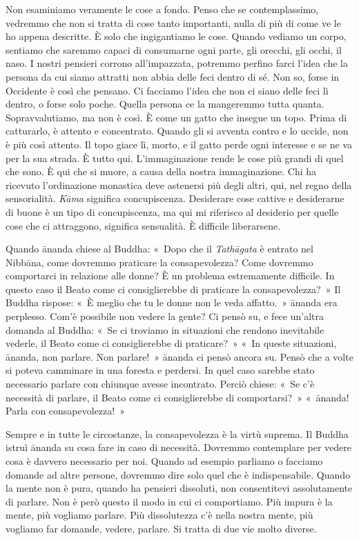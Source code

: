 Non esaminiamo veramente le cose a fondo. Penso che se contemplassimo,
vedremmo che non si tratta di cose tanto importanti, nulla di più di
come ve le ho appena descritte. È solo che ingigantiamo le cose. Quando
vediamo un corpo, sentiamo che saremmo capaci di consumarne ogni parte,
gli orecchi, gli occhi, il naso. I nostri pensieri corrono
all'impazzata, potremmo perfino farci l'idea che la persona da cui siamo
attratti non abbia delle feci dentro di sé. Non so, forse in Occidente è
così che pensano. Ci facciamo l'idea che non ci siano delle feci lì
dentro, o forse solo poche. Quella persona ce la mangeremmo tutta
quanta. Sopravvalutiamo, ma non è così. È come un gatto che insegue un
topo. Prima di catturarlo, è attento e concentrato. Quando gli si
avventa contro e lo uccide, non è più così attento. Il topo giace lì,
morto, e il gatto perde ogni interesse e se ne va per la sua strada. È
tutto qui. L'immaginazione rende le cose più grandi di quel che sono. È
qui che si muore, a causa della nostra immaginazione. Chi ha ricevuto
l'ordinazione monastica deve astenersi più degli altri, qui, nel regno
della sensorialità. \emph{Kāma} significa concupiscenza. Desiderare cose
cattive e desiderarne di buone è un tipo di concupiscenza, ma qui mi
riferisco al desiderio per quelle cose che ci attraggono, significa
sensualità. È difficile liberarsene.

Quando ānanda chiese al Buddha: «~Dopo che il \emph{Tathāgata} è entrato
nel Nibbāna, come dovremmo praticare la consapevolezza? Come
dovremmo comportarci in relazione alle donne? È un problema estremamente
difficile. In questo caso il Beato come ci consiglierebbe di praticare
la consapevolezza?~» Il Buddha rispose: «~È meglio che tu le donne non
le veda affatto.~» ānanda era perplesso. Com'è possibile non vedere la
gente? Ci pensò su, e fece un'altra domanda al Buddha: «~Se ci troviamo
in situazioni che rendono inevitabile vederle, il Beato come ci
consiglierebbe di praticare?~» «~In queste situazioni, ānanda, non
parlare. Non parlare!~» ānanda ci pensò ancora su. Pensò che a volte si
poteva camminare in una foresta e perdersi. In quel caso sarebbe stato
necessario parlare con chiunque avesse incontrato. Perciò chiese: «~Se
c'è necessità di parlare, il Beato come ci consiglierebbe di
comportarsi?~» «~ānanda! Parla con consapevolezza!~»

Sempre e in tutte le circostanze, la consapevolezza è la virtù suprema.
Il Buddha istruì ānanda su cosa fare in caso di necessità. Dovremmo
contemplare per vedere cosa è davvero necessario per noi. Quando ad
esempio parliamo o facciamo domande ad altre persone, dovremmo dire solo
quel che è indispensabile. Quando la mente non è pura, quando ha
pensieri dissoluti, non consentitevi assolutamente di parlare. Non è
però questo il modo in cui ci comportiamo. Più impura è la mente, più
vogliamo parlare. Più dissolutezza c'è nella nostra mente, più vogliamo
far domande, vedere, parlare. Si tratta di due vie molto diverse.

